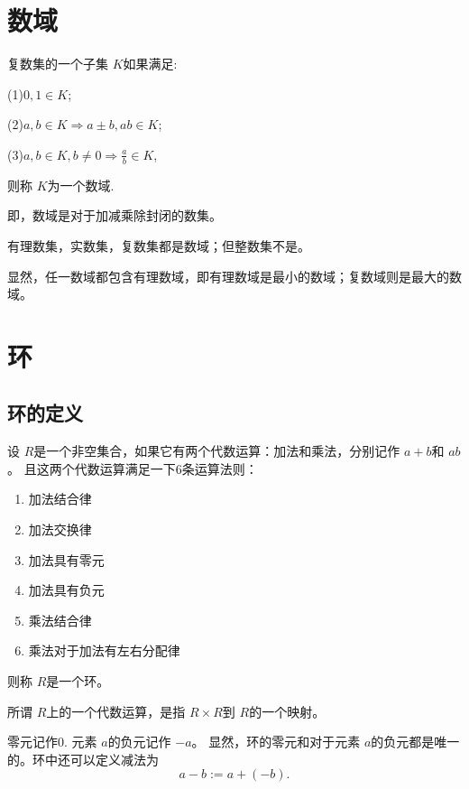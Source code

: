 \section{数域}
\begin{mydef}
    复数集的一个子集 $K$如果满足:

(1)$0,1\in K$;

(2)$a,b\in K\Rightarrow a\pm b,ab\in K$;

(3)$a,b\in K,b\neq 0\Rightarrow \frac{a}{b}\in K$,

则称 $K$为一个数域.
\end{mydef}
\begin{myrmk}
    即，数域是对于加减乘除封闭的数集。
\end{myrmk}
有理数集，实数集，复数集都是数域；但整数集不是。

显然，任一数域都包含有理数域，即有理数域是最小的数域；复数域则是最大的数域。
\section{环}
\subsection{环的定义}
\begin{mydef}
    设 $R$是一个非空集合，如果它有两个代数运算：加法和乘法，分别记作 $a+b$和 $ab$ 。
    且这两个代数运算满足一下6条运算法则：
    \begin{enumerate}
        \item 加法结合律
        \item 加法交换律
        \item 加法具有零元
        \item 加法具有负元
        \item 乘法结合律
        \item 乘法对于加法有左右分配律
    \end{enumerate}
    则称 $R$是一个环。


\end{mydef}
\begin{myrmk}
    所谓 $R$上的一个代数运算，是指 $R\times R$到 $R$的一个映射。

    
\end{myrmk}
    零元记作0.
    元素 $a$的负元记作 $-a$。
显然，环的零元和对于元素 $a$的负元都是唯一的。环中还可以定义减法为
\[a-b:=a+(-b).\]

